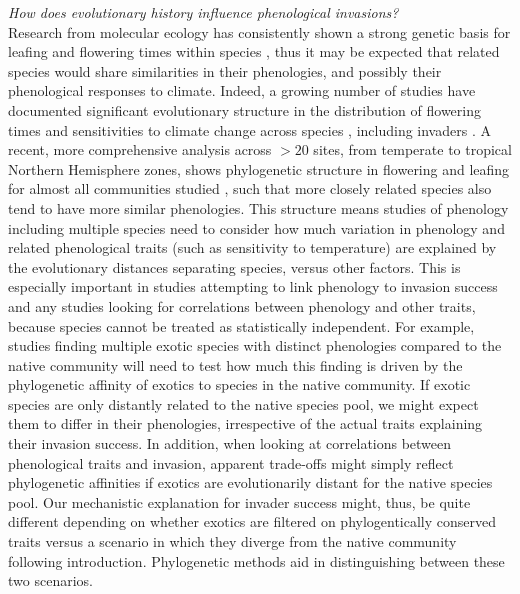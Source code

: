 \documentclass[11pt,a4paper,oneside]{article}
\begin{document}
\noindent \emph{How does evolutionary history influence phenological invasions?}\\ 
\noindent  Research from molecular ecology has consistently shown a strong genetic basis for leafing and flowering times within species \citep{Howe:2003,arabid2011}, thus it may be expected that related species would share similarities in their phenologies, and possibly their phenological responses to climate. Indeed, a growing number of studies have documented significant evolutionary structure in the distribution of flowering times and sensitivities to climate change across species \citep{Willis:2008bf,Davis:2010ls}, including invaders \citep{Willis:2010al,wolkovichAmBot2013}. A recent, more comprehensive analysis across \(>20\) sites, from temperate to tropical Northern Hemisphere zones, shows phylogenetic structure in flowering and leafing for almost all communities studied \citep{phenophylo}, such that more closely related species also tend to have more similar phenologies. This structure means studies of phenology including multiple species need to consider how much variation in phenology and related phenological traits (such as sensitivity to temperature) are explained by the evolutionary distances separating species, versus other factors. This is especially important in studies attempting to link phenology to invasion success and any studies looking for correlations between phenology and other traits, because species cannot be treated as statistically independent. For example, studies finding multiple exotic species with distinct phenologies compared to the native community will need to test how much this finding is driven by the phylogenetic affinity of exotics to species in the native community. If exotic species are only distantly related to the native species pool, we might expect them to differ in their phenologies, irrespective of the actual traits explaining their invasion success. In addition, when looking at correlations between phenological traits and invasion, apparent trade-offs might simply reflect phylogenetic affinities if exotics are evolutionarily distant for the native species pool. Our mechanistic explanation for invader success might, thus, be quite different depending on whether exotics are filtered on phylogentically conserved traits versus a scenario in which they diverge from the native community following introduction. Phylogenetic methods aid in distinguishing between these two scenarios. \\
\end{document}
